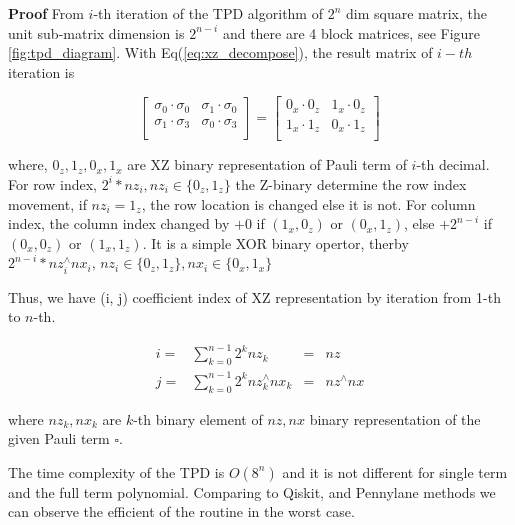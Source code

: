 \textbf{Proof} 
From $i$-th iteration of the TPD algorithm of $2^n$ dim square matrix, 
the unit sub-matrix dimension is $2^{n-i}$ and there are 4 block matrices, see Figure \ref{fig:tpd_diagram}.
With Eq(\ref{eq:xz_decompose}), the result matrix of $i-th$ iteration is

\begin{equation}
    \begin{bmatrix}
        \sigma_0 \cdot \sigma_0 & \sigma_1 \cdot \sigma_0\\
        \sigma_1 \cdot \sigma_3 & \sigma_0 \cdot \sigma_3\\
    \end{bmatrix}
    = 
    \begin{bmatrix}
        0_x \cdot 0_z & 1_x \cdot 0_z\\
        1_x \cdot 1_z & 0_x \cdot 1_z\\
    \end{bmatrix}
\end{equation}

where, $0_z, 1_z, 0_x, 1_x$ are XZ binary representation of Pauli term of $i$-th decimal.
For row index, $2^{i} * nz_i, nz_i\in \{0_z, 1_z\}$ the Z-binary determine
the row index movement, if $nz_i = 1_z$, the row location is changed else it is not.
For column index, the column index changed by $+0$ if $(1_x, 0_z)$ or $(0_x, 1_z)$, 
else $+2^{n-i}$ if $(0_x, 0_z)$ or $(1_x, 1_z)$.
It is a simple XOR binary opertor, therby 
$2^{n-i} * nz_i^{\wedge}nx_i, \, nz_i\in \{0_z, 1_z\}, nx_i \in \{0_x, 1_x\}$

Thus, we have (i, j) coefficient index of XZ representation by iteration from 1-th to $n$-th. 

\begin{equation}
    \begin{array}{clcc}
    i =& \sum_{k=0}^{n-1} 2^{k} nz_k &=& nz\\
    j =& \sum_{k=0}^{n-1} 2^{k} nz_k^{\wedge} nx_k &=& nz^{\wedge}nx
    \end{array}
\end{equation}

where $nz_k, nx_k$ are $k$-th binary element of $nz, nx$ binary representation of the given Pauli term $\square$.

The time complexity of the TPD is $O(8^n)$ and it is not different for single term and the 
full term polynomial. 
Comparing to Qiskit, and Pennylane methods we can observe the efficient of the 
routine in the worst case.


